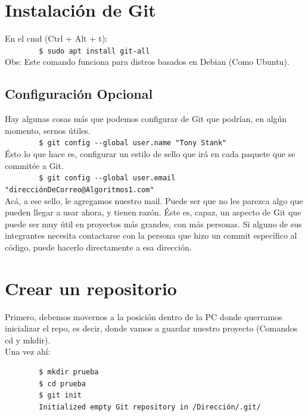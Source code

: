 \documentclass[a4paper, 12pt]{article}
\begin{document}
\newpage

\section{Instalación de Git}

En el cmd (Ctrl + Alt + t):\\

\verb+        $ sudo apt install git-all+\\

Obs: Este comando funciona para distros basados en Debian (Como Ubuntu).

\subsection{Configuración Opcional}

Hay algunas cosas más que podemos configurar de Git que podrían, en algún momento, sernos útiles.\\

\verb+        $ git config --global user.name "Tony Stank"+\\

Ésto lo que hace es, configurar un estilo de sello que irá en cada paquete que se commitée a Git.\\

\verb+        $ git config --global user.email "direcciónDeCorreo@Algoritmos1.com"+\\

Acá, a ese sello, le agregamos nuestro mail. Puede ser que no les parezca algo que pueden llegar a usar ahora, y tienen razón. Éste es, capaz, un aspecto de Git que puede ser muy útil en proyectos más grandes, con más personas. Si alguno de sus integrantes necesita contactarse con la persona que hizo un commit específico al código, puede hacerlo directamente a esa dirección.

\newpage
\section{Crear un repositorio}

Primero, debemos movernos a la posición dentro de la PC donde querramos inicializar el repo, es decir, donde vamos a guardar nuestro proyecto (Comandos cd y mkdir).\\

Una vez ahí:
    
\begin{verbatim}
        $ mkdir prueba
        $ cd prueba
        $ git init 
        Initialized empty Git repository in /Dirección/.git/ 
\end{verbatim}
    
\end{document}

